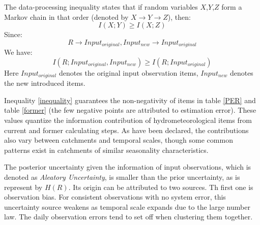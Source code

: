 \documentclass[11pt]{article}
\begin{document}
The data-processing inequality states that if random variables $X$,$Y$,$Z$ form a Markov chain in that order (denoted by $X \rightarrow Y \rightarrow Z$), then:
\begin{equation}
I(X;Y) \geq I(X;Z)
\end{equation}
Since:
\begin{equation}
R \rightarrow Input_{original},Input_{new} \rightarrow Input_{original}
\end{equation} 
We have:
\begin{equation}
\label{inequality}
I(R;Input_{original},Input_{new}) \geq I(R;Input_{original})
\end{equation}
Here $Input_{original}$ denotes the original input observation items, $Input_{new}$ denotes the new introduced items.  

Inequality \ref{inequality} guarantees the non-negativity of items in table \ref{PER} and table \ref{former} (the few negative points are attributed to estimation error).  
These values quantize the information contribution of  hydrometeorological items from current and former calculating steps. As have been declared, the contributions also vary between catchments and temporal scales, though some common patterns exist in catchments of similar seasonality characteristics.




The posterior uncertainty given the information of input observations, which is denoted as \emph{Aleatory Uncertainty}, is smaller than the prior uncertainty, as is represent by $H(R)$. Its origin can be attributed to two sources. Th first one is  observation bias. For consistent observations with no system error, this uncertainty source  weakens as temporal scale expands  due to the large number law. The daily observation errors tend to set off when clustering them together. 
\end{document}
